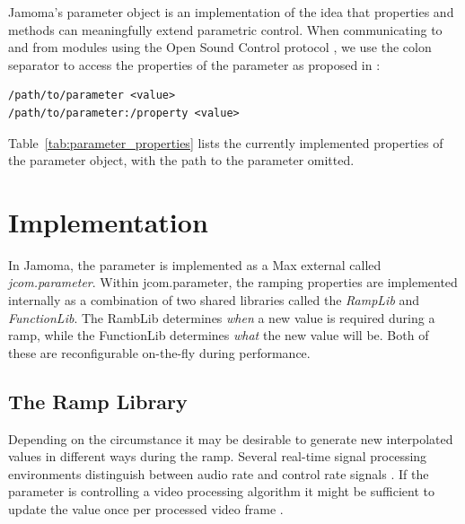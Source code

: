 \documentclass{article}
\begin{document}
Jamoma's parameter object is an implementation of the idea that properties and methods can meaningfully extend parametric control. When communicating to and from modules using the Open Sound Control protocol \cite{Wright:2003}, we use the colon separator to access the properties of the parameter as proposed in \cite{Place:2008}:

\begin{small}
\begin{verbatim}
/path/to/parameter <value>
/path/to/parameter:/property <value>
\end{verbatim}
\end{small}

Table~\ref{tab:parameter_properties} lists the currently implemented properties of the parameter object, with the path to the parameter omitted.


\section{Implementation} %
\label{sec:param_implementation}

In Jamoma, the parameter is implemented as a Max external called \emph{jcom.parameter}. Within jcom.parameter, the ramping properties are implemented internally as a combination of two shared libraries called the \emph{RampLib} and \emph{FunctionLib}. The RambLib determines \emph{when} a new value is required during a ramp, while the FunctionLib determines \emph{what} the new value will be. Both of these are reconfigurable on-the-fly during performance.

\subsection{The Ramp Library} %
\label{ssec:ramplib}

Depending on the circumstance it may be desirable to generate new interpolated values in different ways during the ramp. Several real-time signal processing environments distinguish between audio rate and control rate signals \cite{Boulanger:2000csound, McCartney:1996supercollider}. If the parameter is controlling a video processing algorithm it might be sufficient to update the value once per processed video frame \cite{Jones:2005jitter}.
\end{document}
